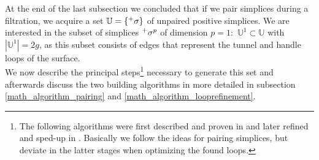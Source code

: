 At the end of the last subsection we concluded that if we pair simplices during a filtration, we acquire a set $\mathbb{U} = \{ \Prefix^{+}{\sigma}\}$ of unpaired positive simplices.
We are interested in the subset of simplices $\Prefix^{+}{\sigma^{p}}$ of dimension $p = 1$: $\,\mathbb{U}^{1} \subset \mathbb{U}$  with $|\mathbb{U}^{1}| = 2g$, as this subset consists of edges that represent the tunnel and handle loops of the surface.\\
We now describe the principal steps\footnote{ The following algorithms were first described and proven in \citep[][]{Dey2007} and later refined and sped-up in \citep[][]{Dey2008, Dey2009}. Basically we follow the ideas for pairing simplices, but deviate in the latter stages when optimizing the found loops.} necessary to generate this set and afterwards discuss the two building algorithms in more detailed in subsection \ref{math_algorithm_pairing} and \ref{math_algorithm_looprefinement}.\\
\vspace*{-1.0cm}

